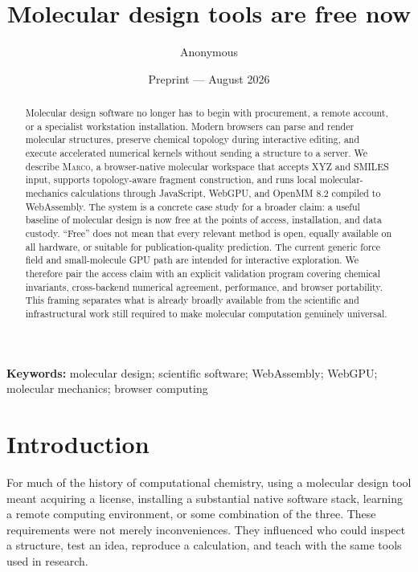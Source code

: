 \documentclass[11pt]{article}
\title{Molecular design tools are free now}
\author{Anonymous}
\date{Preprint --- August 2026}
\newcommand{\marco}{\textsc{Marco}}
\newif\ifdraft
\newcommand{\draftnote}[1]{%
  \ifdraft
    \par\noindent
    \colorbox{yellow!20}{%
      \parbox{\dimexpr\linewidth-2\fboxsep\relax}{%
        \textbf{Draft note:} #1%
      }%
    }%
    \par
  \fi
}
\begin{document}
\maketitle

\begin{abstract}
Molecular design software no longer has to begin with procurement, a remote
account, or a specialist workstation installation.
Modern browsers can parse and render molecular structures, preserve chemical
topology during interactive editing, and execute accelerated numerical kernels
without sending a structure to a server.
We describe \marco, a browser-native molecular workspace that accepts XYZ and
SMILES input, supports topology-aware fragment construction, and runs local
molecular-mechanics calculations through JavaScript, WebGPU, and OpenMM 8.2
compiled to WebAssembly.
The system is a concrete case study for a broader claim: a useful baseline of
molecular design is now free at the points of access, installation, and data
custody.
``Free'' does not mean that every relevant method is open, equally available on
all hardware, or suitable for publication-quality prediction.
The current generic force field and small-molecule GPU path are intended for
interactive exploration.
We therefore pair the access claim with an explicit validation program covering
chemical invariants, cross-backend numerical agreement, performance, and browser
portability.
This framing separates what is already broadly available from the scientific and
infrastructural work still required to make molecular computation genuinely
universal.
\end{abstract}

\noindent\textbf{Keywords:}
molecular design; scientific software; WebAssembly; WebGPU; molecular mechanics;
browser computing

\draftnote{Replace the author metadata and decide whether this is primarily a
  software paper, a perspective, or an empirical access study. The present draft
  treats \marco{} as a case study inside a broader position paper.}

\section{Introduction}
\label{sec:introduction}

For much of the history of computational chemistry, using a molecular design
tool meant acquiring a license, installing a substantial native software stack,
learning a remote computing environment, or some combination of the three.
These requirements were not merely inconveniences.
They influenced who could inspect a structure, test an idea, reproduce a
calculation, and teach with the same tools used in research.
\end{document}
